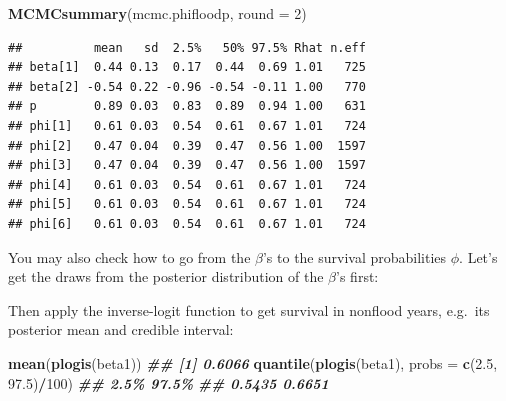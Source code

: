 \documentclass[
  12pt,
]{krantz}
\newenvironment{Shaded}{\begin{snugshade}}{\end{snugshade}}
\newcommand{\AttributeTok}[1]{\textcolor[rgb]{0.13,0.29,0.53}{#1}}
\newcommand{\CommentTok}[1]{\textcolor[rgb]{0.56,0.35,0.01}{\textit{#1}}}
\newcommand{\DecValTok}[1]{\textcolor[rgb]{0.00,0.00,0.81}{#1}}
\newcommand{\DocumentationTok}[1]{\textcolor[rgb]{0.56,0.35,0.01}{\textbf{\textit{#1}}}}
\newcommand{\FloatTok}[1]{\textcolor[rgb]{0.00,0.00,0.81}{#1}}
\newcommand{\FunctionTok}[1]{\textcolor[rgb]{0.13,0.29,0.53}{\textbf{#1}}}
\newcommand{\NormalTok}[1]{#1}
\newcommand{\OtherTok}[1]{\textcolor[rgb]{0.56,0.35,0.01}{#1}}
\newcommand{\SpecialCharTok}[1]{\textcolor[rgb]{0.81,0.36,0.00}{\textbf{#1}}}
\newcommand{\StringTok}[1]{\textcolor[rgb]{0.31,0.60,0.02}{#1}}
\begin{document}
\begin{Shaded}
\begin{Highlighting}[]
\FunctionTok{MCMCsummary}\NormalTok{(mcmc.phifloodp, }\AttributeTok{round =} \DecValTok{2}\NormalTok{)}
\end{Highlighting}
\end{Shaded}

\begin{verbatim}
##          mean   sd  2.5%   50% 97.5% Rhat n.eff
## beta[1]  0.44 0.13  0.17  0.44  0.69 1.01   725
## beta[2] -0.54 0.22 -0.96 -0.54 -0.11 1.00   770
## p        0.89 0.03  0.83  0.89  0.94 1.00   631
## phi[1]   0.61 0.03  0.54  0.61  0.67 1.01   724
## phi[2]   0.47 0.04  0.39  0.47  0.56 1.00  1597
## phi[3]   0.47 0.04  0.39  0.47  0.56 1.00  1597
## phi[4]   0.61 0.03  0.54  0.61  0.67 1.01   724
## phi[5]   0.61 0.03  0.54  0.61  0.67 1.01   724
## phi[6]   0.61 0.03  0.54  0.61  0.67 1.01   724
\end{verbatim}

You may also check how to go from the \(\beta\)'s to the survival probabilities \(\phi\). Let's get the draws from the posterior distribution of the \(\beta\)'s first:

\begin{Shaded}
\end{Shaded}

Then apply the inverse-logit function to get survival in nonflood years, e.g.~its posterior mean and credible interval:

\begin{Shaded}
\begin{Highlighting}[]
\FunctionTok{mean}\NormalTok{(}\FunctionTok{plogis}\NormalTok{(beta1))}
\DocumentationTok{\#\# [1] 0.6066}
\FunctionTok{quantile}\NormalTok{(}\FunctionTok{plogis}\NormalTok{(beta1), }\AttributeTok{probs =} \FunctionTok{c}\NormalTok{(}\FloatTok{2.5}\NormalTok{, }\FloatTok{97.5}\NormalTok{)}\SpecialCharTok{/}\DecValTok{100}\NormalTok{)}
\DocumentationTok{\#\#   2.5\%  97.5\% }
\DocumentationTok{\#\# 0.5435 0.6651}
\end{Highlighting}
\end{Shaded}
\end{document}
